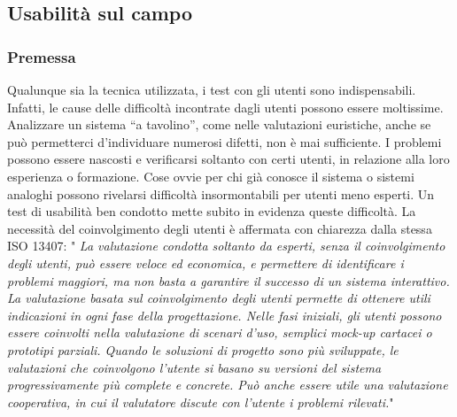 \subsection{Usabilità sul campo}
    \subsubsection{Premessa}
        \begin{flushleft}
        Qualunque sia la tecnica utilizzata, i test con gli utenti sono indispensabili. Infatti, le cause delle difficoltà incontrate
        dagli utenti possono essere moltissime. Analizzare un sistema “a tavolino”, come nelle valutazioni euristiche, anche se
        può permetterci d'individuare numerosi difetti, non è mai sufficiente. I problemi possono essere nascosti e verificarsi
        soltanto con certi utenti, in relazione alla loro esperienza o formazione. Cose ovvie per chi già conosce il sistema o
        sistemi analoghi possono rivelarsi difficoltà insormontabili per utenti meno esperti. Un test di usabilità ben condotto
        mette subito in evidenza queste difficoltà. La necessità del coinvolgimento degli utenti è affermata con chiarezza dalla
        stessa ISO 13407: "
            \emph{La valutazione condotta soltanto da esperti, senza il coinvolgimento degli utenti, può essere veloce ed
            economica, e permettere di identificare i problemi maggiori, ma non basta a garantire il successo di un
            sistema interattivo. La valutazione basata sul coinvolgimento degli utenti permette di ottenere utili indicazioni
            in ogni fase della progettazione. Nelle fasi iniziali, gli utenti possono essere coinvolti nella valutazione di
            scenari d’uso, semplici mock-up cartacei o prototipi parziali. Quando le soluzioni di progetto sono più
            sviluppate, le valutazioni che coinvolgono l’utente si basano su versioni del sistema progressivamente più
            complete e concrete. Può anche essere utile una valutazione cooperativa, in cui il valutatore discute con
            l’utente i problemi rilevati.}"
        \end{flushleft}
    
